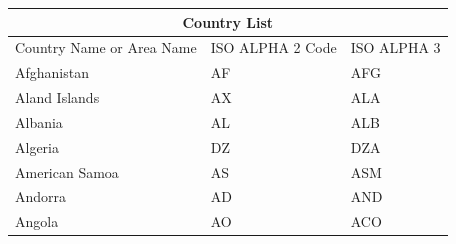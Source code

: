 \documentclass[10pt,a4paper]{article}
\begin{document}
    \begin{tabular}{|l|l|l|}
        \hline
        \multicolumn{3}{|c|}{Country List}\\
        \hline
        Country Name or Area Name & ISO ALPHA 2 Code & ISO ALPHA 3 \\
        \hline
        Afghanistan & AF & AFG \\
        Aland Islands & AX & ALA \\
        Albania & AL & ALB \\
        Algeria & DZ & DZA \\
        American Samoa & AS & ASM \\
        Andorra & AD & AND \\
        Angola & AO & ACO \\
        \hline
    \end{tabular}
\end{document}
